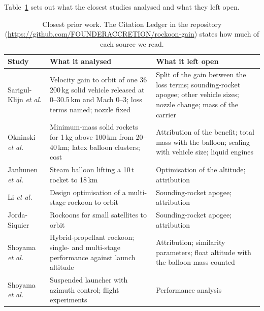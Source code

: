 \documentclass[11pt,a4paper]{article}
\begin{document}
Table~\ref{tab:prior} sets out what the closest studies analysed and what they left open.

\begin{table}[!htb]
\centering
\caption{Closest prior work. The Citation Ledger in the repository (\url{https://github.com/FOUNDERACCRETION/rockoon-gain}) states how much of each source we read.}
\label{tab:prior}
\footnotesize
\begin{tabular}{@{}>{\raggedright\arraybackslash}p{2.8cm}>{\raggedright\arraybackslash}p{5.6cm}>{\raggedright\arraybackslash}p{6.0cm}@{}}
\toprule
Study & What it analysed & What it left open \\
\midrule
Sarigul-Klijn \emph{et al.} \cite{sarigul2005} & Velocity gain to orbit of one 36\,200\,kg solid vehicle released at 0--30.5\,km and Mach 0--3; loss terms named; nozzle fixed & Split of the gain between the loss terms; sounding-rocket apogee; other vehicle sizes; nozzle change; mass of the carrier \\
Okninski \emph{et al.} \cite{okninski2016} & Minimum-mass solid rockets for 1\,kg above 100\,km from 20--40\,km; latex balloon clusters; cost & Attribution of the benefit; total mass with the balloon; scaling with vehicle size; liquid engines \\
Janhunen \emph{et al.} \cite{janhunen2018} & Steam balloon lifting a 10\,t rocket to 18\,km & Optimisation of the altitude; attribution \\
Li \emph{et al.} \cite{li2022} & Design optimisation of a multi-stage rockoon to orbit & Sounding-rocket apogee; attribution \\
Jorda-Siquier \cite{jorda2012} & Rockoons for small satellites to orbit & Sounding-rocket apogee; attribution \\
Shoyama \emph{et al.} \cite{shoyama2022} & Hybrid-propellant rockoon; single- and multi-stage performance against launch altitude & Attribution; similarity parameters; float altitude with the balloon mass counted \\
Shoyama \emph{et al.} \cite{shoyama2021,shoyama2026} & Suspended launcher with azimuth control; flight experiments & Performance analysis \\
\bottomrule
\end{tabular}
\end{table}
\end{document}
